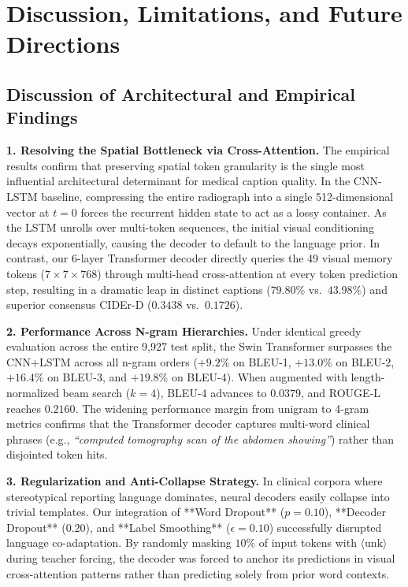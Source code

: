 \chapter{Discussion, Limitations, and Future Directions}

\section{Discussion of Architectural and Empirical Findings}

\textbf{1. Resolving the Spatial Bottleneck via Cross-Attention.}
The empirical results confirm that preserving spatial token granularity is the single most influential architectural determinant for medical caption quality. In the CNN-LSTM baseline, compressing the entire radiograph into a single 512-dimensional vector at $t=0$ forces the recurrent hidden state to act as a lossy container. As the LSTM unrolls over multi-token sequences, the initial visual conditioning decays exponentially, causing the decoder to default to the language prior. In contrast, our 6-layer Transformer decoder directly queries the 49 visual memory tokens ($7 \times 7 \times 768$) through multi-head cross-attention at every token prediction step, resulting in a dramatic leap in distinct captions ($79.80\%$ vs.\ $43.98\%$) and superior consensus CIDEr-D ($0.3438$ vs.\ $0.1726$).

\textbf{2. Performance Across N-gram Hierarchies.}
Under identical greedy evaluation across the entire 9,927 test split, the Swin Transformer surpasses the CNN+LSTM across all n-gram orders ($+9.2\%$ on BLEU-1, $+13.0\%$ on BLEU-2, $+16.4\%$ on BLEU-3, and $+19.8\%$ on BLEU-4). When augmented with length-normalized beam search ($k=4$), BLEU-4 advances to $0.0379$, and ROUGE-L reaches $0.2160$. The widening performance margin from unigram to 4-gram metrics confirms that the Transformer decoder captures multi-word clinical phrases (e.g., \emph{``computed tomography scan of the abdomen showing''}) rather than disjointed token hits.

\textbf{3. Regularization and Anti-Collapse Strategy.}
In clinical corpora where stereotypical reporting language dominates, neural decoders easily collapse into trivial templates. Our integration of **Word Dropout** ($p=0.10$), **Decoder Dropout** ($0.20$), and **Label Smoothing** ($\epsilon=0.10$) successfully disrupted language co-adaptation. By randomly masking $10\%$ of input tokens with $\langle\mathrm{unk}\rangle$ during teacher forcing, the decoder was forced to anchor its predictions in visual cross-attention patterns rather than predicting solely from prior word contexts.

